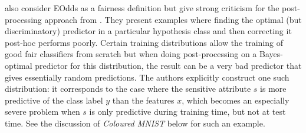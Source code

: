 \citet{woodworth2017learning} also consider \ac{EOdds} as a fairness definition but give strong
criticism for the post-processing approach from \citet{hardt2016equality}. They present examples
where finding the optimal (but discriminatory) predictor in a particular hypothesis class and then
correcting it post-hoc performs poorly.
Certain training distributions allow the training of good fair classifiers from scratch but when
doing post-processing on a Bayes-optimal predictor for this distribution, the result can be a very
bad predictor that gives essentially random predictions. The authors explicitly construct one such
distribution: it corresponds to the case where the sensitive attribute \(s\) is more predictive of
the class label \(y\) than the features \(x\), which becomes an especially severe problem when
\(s\) is only predictive during training time, but not at test time. See the discussion of
\emph{Coloured MNIST} below for such an example.


